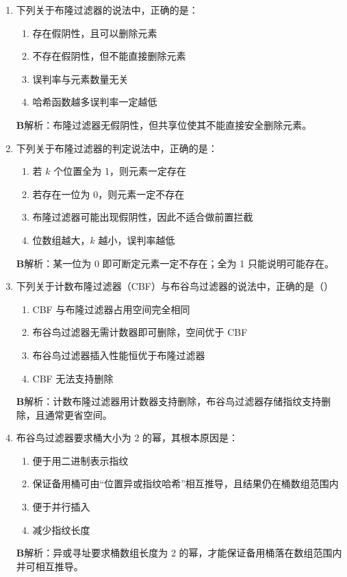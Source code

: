 \documentclass[UTF8,a4paper,11pt]{ctexart}
\newenvironment{answer}%
  {\begin{ans}\noindent{\bfseries\color{ansframe}【答案】}\hspace{0.4em}}%
  {\end{ans}}
\begin{document}
\begin{enumerate}
\item 下列关于布隆过滤器的说法中，正确的是：
\begin{enumerate}[label=\Alph*., leftmargin=2.2em, itemsep=1pt]
\item 存在假阴性，且可以删除元素
\item 不存在假阴性，但不能直接删除元素
\item 误判率与元素数量无关
\item 哈希函数越多误判率一定越低
\end{enumerate}
\begin{answer}
\textbf{B}\quad 解析：布隆过滤器无假阴性，但共享位使其不能直接安全删除元素。
\end{answer}

\item 下列关于布隆过滤器的判定说法中，正确的是：
\begin{enumerate}[label=\Alph*., leftmargin=2.2em, itemsep=1pt]
\item 若 $k$ 个位置全为 1，则元素一定存在
\item 若存在一位为 0，则元素一定不存在
\item 布隆过滤器可能出现假阴性，因此不适合做前置拦截
\item 位数组越大，$k$ 越小，误判率越低
\end{enumerate}
\begin{answer}
\textbf{B}\quad 解析：某一位为 0 即可断定元素一定不存在；全为 1 只能说明可能存在。
\end{answer}

\item 下列关于计数布隆过滤器（CBF）与布谷鸟过滤器的说法中，正确的是（\quad）
\begin{enumerate}[label=\Alph*., leftmargin=2.2em, itemsep=1pt]
\item CBF 与布隆过滤器占用空间完全相同
\item 布谷鸟过滤器无需计数器即可删除，空间优于 CBF
\item 布谷鸟过滤器插入性能恒优于布隆过滤器
\item CBF 无法支持删除
\end{enumerate}
\begin{answer}
\textbf{B}\quad 解析：计数布隆过滤器用计数器支持删除，布谷鸟过滤器存储指纹支持删除，且通常更省空间。
\end{answer}

\item 布谷鸟过滤器要求桶大小为 2 的幂，其根本原因是：
\begin{enumerate}[label=\Alph*., leftmargin=2.2em, itemsep=1pt]
\item 便于用二进制表示指纹
\item 保证备用桶可由“位置异或指纹哈希”相互推导，且结果仍在桶数组范围内
\item 便于并行插入
\item 减少指纹长度
\end{enumerate}
\begin{answer}
\textbf{B}\quad 解析：异或寻址要求桶数组长度为 2 的幂，才能保证备用桶落在数组范围内并可相互推导。
\end{answer}


\end{enumerate}
\end{document}
